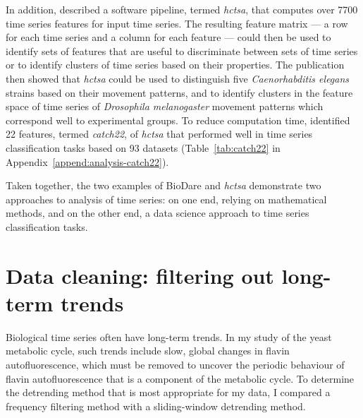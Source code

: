 In addition, \textcite{fulcherHctsaComputationalFramework2017} described a software pipeline, termed \textit{hctsa}, that computes over 7700 time series features for input time series.
The resulting feature matrix --- a row for each time series and a column for each feature --- could then be used to identify sets of features that are useful to discriminate between sets of time series or to identify clusters of time series based on their properties.
The publication then showed that \textit{hctsa} could be used to distinguish five \textit{Caenorhabditis elegans} strains based on their movement patterns, and to identify clusters in the feature space of time series of \textit{Drosophila melanogaster} movement patterns which correspond well to experimental groups.
To reduce computation time, \textcite{lubbaCatch22CAnonicalTimeseries2019} identified 22 features, termed \textit{catch22}, of \textit{hctsa} that performed well in time series classification tasks based on 93 datasets (Table~\ref{tab:catch22} in Appendix~\ref{append:analysis-catch22}).

Taken together, the two examples of BioDare and \textit{hctsa} demonstrate two approaches to analysis of time series: on one end, relying on mathematical methods, and on the other end, a data science approach to time series classification tasks.


\section{Data cleaning: filtering out long-term trends}
\label{sec:analysis-cleaning}

Biological time series often have long-term trends.
In my study of the yeast metabolic cycle, such trends include slow, global changes in flavin autofluorescence, which must be removed to uncover the periodic behaviour of flavin autofluorescence that is a component of the metabolic cycle.
To determine the detrending method that is most appropriate for my data, I compared a frequency filtering method with a sliding-window detrending method.


